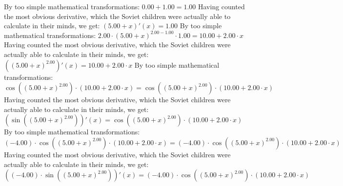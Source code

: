 \documentclass{article}
\begin{document}
By too simple mathematical transformations:
 ${{0.00} + {1.00}} = {1.00}$ 
 \newline
 \newline 
Having counted the most obvious derivative, which the Soviet children were actually able to calculate in their minds, we get:
$({{5.00} + {x}})'(x) = {1.00}$\newline
\newline
By too simple mathematical transformations:
 ${{{2.00} \cdot {\left({{5.00} + {x}}\right) ^ {{2.00} - {1.00}}}} \cdot {1.00}} = {{10.00} + {{2.00} \cdot {x}}}$ 
 \newline
 \newline 
Having counted the most obvious derivative, which the Soviet children were actually able to calculate in their minds, we get:
$({\left({{5.00} + {x}}\right) ^ {2.00}})'(x) = {{10.00} + {{2.00} \cdot {x}}}$\newline
\newline
By too simple mathematical transformations:
 ${ \cos {\left({\left({{5.00} + {x}}\right) ^ {2.00}}\right)}  \cdot \left({{10.00} + {{2.00} \cdot {x}}}\right)} = { \cos {\left({\left({{5.00} + {x}}\right) ^ {2.00}}\right)}  \cdot \left({{10.00} + {{2.00} \cdot {x}}}\right)}$ 
 \newline
 \newline 
Having counted the most obvious derivative, which the Soviet children were actually able to calculate in their minds, we get:
$( \sin {\left({\left({{5.00} + {x}}\right) ^ {2.00}}\right)} )'(x) = { \cos {\left({\left({{5.00} + {x}}\right) ^ {2.00}}\right)}  \cdot \left({{10.00} + {{2.00} \cdot {x}}}\right)}$\newline
\newline
By too simple mathematical transformations:
 ${\left({-4.00}\right) \cdot { \cos {\left({\left({{5.00} + {x}}\right) ^ {2.00}}\right)}  \cdot \left({{10.00} + {{2.00} \cdot {x}}}\right)}} = {\left({-4.00}\right) \cdot { \cos {\left({\left({{5.00} + {x}}\right) ^ {2.00}}\right)}  \cdot \left({{10.00} + {{2.00} \cdot {x}}}\right)}}$ 
 \newline
 \newline 
Having counted the most obvious derivative, which the Soviet children were actually able to calculate in their minds, we get:
$({\left({-4.00}\right) \cdot  \sin {\left({\left({{5.00} + {x}}\right) ^ {2.00}}\right)} })'(x) = {\left({-4.00}\right) \cdot { \cos {\left({\left({{5.00} + {x}}\right) ^ {2.00}}\right)}  \cdot \left({{10.00} + {{2.00} \cdot {x}}}\right)}}$\newline
\end{document}
